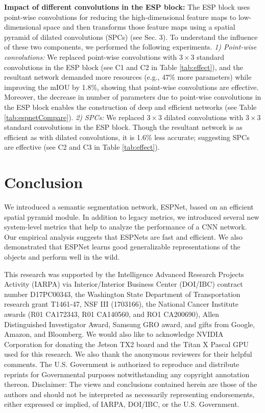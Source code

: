 \documentclass[runningheads]{llncs}
\begin{document}
\noindent \textbf{Impact of different convolutions in the ESP block:} The ESP block uses point-wise convolutions for reducing the high-dimensional feature maps to low-dimensional space and then transforms those feature maps using a spatial pyramid of dilated convolutions (SPCs) (see Sec. 3). To understand the influence of these two components, we performed the following experiments. 
\textit{1) Point-wise convolutions:} We replaced point-wise convolutions with $3\times 3$ standard convolutions in the ESP block (see C1 and C2 in Table \ref{tab:effect}), and the resultant network demanded more resources (e.g., 47\% more parameters) while improving the mIOU by 1.8\%, showing that point-wise convolutions are effective. Moreover, the decrease in number of parameters due to point-wise convolutions in the ESP block enables the construction of deep and efficient networks (see Table \ref{tab:espnetCompare}). 
\textit{2) SPCs:} We replaced $3\times 3$ dilated convolutions with $3\times 3$ standard convolutions in the ESP block. Though the resultant network is as efficient as with dilated convolutions, it is 1.6\% less accurate; suggesting SPCs are effective (see C2 and C3 in Table \ref{tab:effect}).


\section{Conclusion}
We introduced a semantic segmentation network, ESPNet, based on an efficient spatial pyramid module. In addition to legacy metrics, we introduced several new system-level metrics that help to analyze the performance of a CNN network. Our empirical analysis suggests that ESPNets are fast and efficient. We also demonstrated that ESPNet learns good generalizable representations of the objects and perform well in the wild. 

\begin{small}
	\vspace{0.2cm}
 This research was supported by the Intelligence Advanced Research Projects Activity (IARPA) via Interior/Interior Business Center (DOI/IBC) contract number D17PC00343, the Washington  State  Department  of  Transportation  research grant T1461-47, NSF III (1703166), the National Cancer Institute awards (R01 CA172343, R01 CA140560, and RO1 CA200690), Allen Distinguished Investigator Award, Samsung GRO award, and gifts from Google, Amazon, and Bloomberg. We would also like to acknowledge NVIDIA Corporation for donating the Jetson TX2 board and the Titan X Pascal GPU used for this research. We also thank the anonymous reviewers for their helpful comments. The U.S. Government is authorized to reproduce and distribute reprints for Governmental purposes notwithstanding any copyright annotation thereon. Disclaimer: The views and conclusions contained herein are those of the authors and should not be interpreted as necessarily representing endorsements, either expressed or implied, of IARPA, DOI/IBC, or the U.S. Government.
\end{small}
\end{document}
